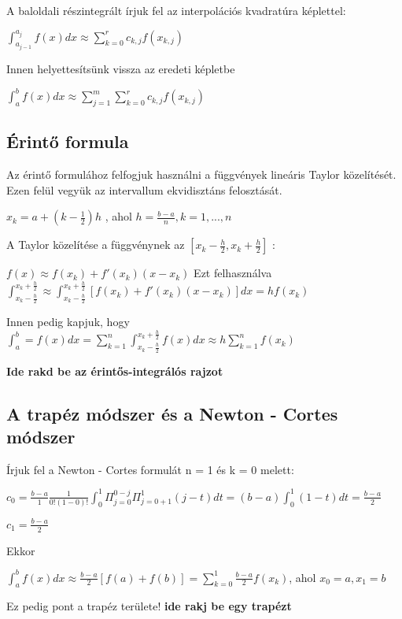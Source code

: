 \documentclass{article}
\theoremstyle{definition}
\begin{document}
A baloldali részintegrált írjuk fel az interpolációs kvadratúra képlettel:
\begin{center}
$\int_{a_{j-1}}^{a_j} f(x) dx \approx \sum_{k=0}^{r} c_{k,j}f(x_{k,j})$
\end{center}

Innen helyettesítsünk vissza az eredeti képletbe
\begin{center}
$\int_a^b f(x) dx \approx \sum_{j=1}^{m} \sum_{k=0}^{r} c_{k,j} f(x_{k,j})$
\end{center}


\subsection{Érintő formula}

Az érintő formulához felfogjuk használni a függvények lineáris Taylor közelítését. Ezen felül vegyük az intervallum ekvidisztáns felosztását.
\begin{center}
   $x_k = a + (k - \frac{1}{2})h$ , ahol $h = \frac{b-a}{n}, k =1,...,n$ 
\end{center}
A Taylor közelítése a függvénynek az $[x_k-\frac{h}{2},x_k+\frac{h}{2}]$ :
\begin{center}
   $f(x) \approx f(x_k)+f'(x_k)(x-x_k)$ 
   Ezt felhasználva
$\int_{x_k - \frac{h}{2}}^{x_k + \frac{h}{2}} \approx \int_{x_k - \frac{h}{2}}^{x_k + \frac{h}{2}} [f(x_k) + f'(x_k)(x-x_k)] dx = hf(x_k)$

Innen pedig kapjuk, hogy
$\int_a^b = f(x) dx = \sum_{k=1}^n \int_{x_k - \frac{h}{2}}^{x_k + \frac{h}{2}} f(x)dx \approx h \sum_{k=1}^n f(x_k)$
\end{center}

\textbf{Ide rakd be az érintős-integrálós rajzot}

\subsection{A trapéz módszer és a Newton - Cortes módszer}
Írjuk fel a Newton - Cortes formulát n = 1 és k = 0 melett:
\begin{center}
$c_0 = \frac{b-a}{1} \frac{1}{0!(1-0)!} \int_0^{1} \Pi_{j=0}^{0-j} \Pi_{j=0+1}^{1} (j-t) dt = (b-a) \int_0^1 (1-t) dt = \frac{b-a}{2}$
\end{center}

\begin{center}
$c_1 = \frac{b-a}{2}$
\end{center}
Ekkor 

\begin{center}
    $\int_a^b f(x) dx \approx \frac{b-a}{2}[f(a) + f(b)] = \sum_{k=0}^{1} \frac{b-a}{2} f(x_k)$, ahol $x_0 = a,x_1=b$
\end{center}
Ez pedig pont a trapéz területe!
\newline
\textbf{ide rakj be egy trapézt}
\end{document}
